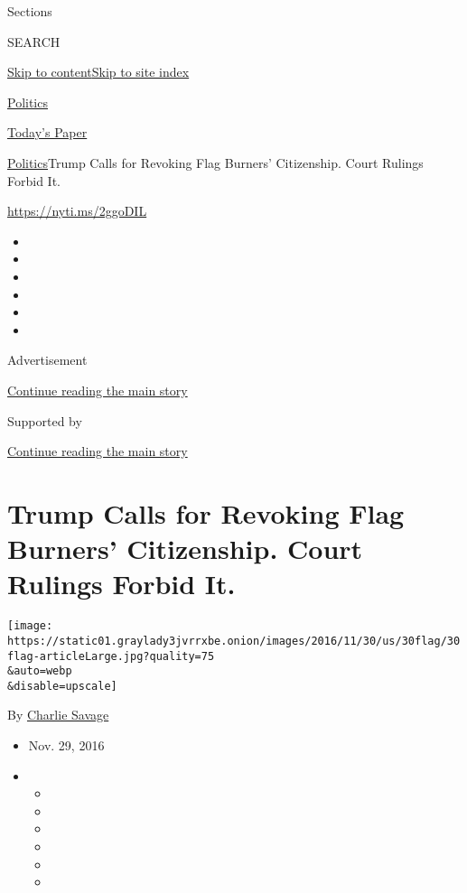 Sections

SEARCH

\protect\hyperlink{site-content}{Skip to
content}\protect\hyperlink{site-index}{Skip to site index}

\href{https://www.nytimes3xbfgragh.onion/section/politics}{Politics}

\href{https://myaccount.nytimes3xbfgragh.onion/auth/login?response_type=cookie\&client_id=vi}{}

\href{https://www.nytimes3xbfgragh.onion/section/todayspaper}{Today's
Paper}

\href{/section/politics}{Politics}\textbar{}Trump Calls for Revoking
Flag Burners' Citizenship. Court Rulings Forbid It.

\url{https://nyti.ms/2ggoDIL}

\begin{itemize}
\item
\item
\item
\item
\item
\item
\end{itemize}

Advertisement

\protect\hyperlink{after-top}{Continue reading the main story}

Supported by

\protect\hyperlink{after-sponsor}{Continue reading the main story}

\hypertarget{trump-calls-for-revoking-flag-burners-citizenship-court-rulings-forbid-it}{%
\section{Trump Calls for Revoking Flag Burners' Citizenship. Court
Rulings Forbid
It.}\label{trump-calls-for-revoking-flag-burners-citizenship-court-rulings-forbid-it}}

\texttt{[image: https://static01.graylady3jvrrxbe.onion/images/2016/11/30/us/30flag/30flag-articleLarge.jpg?quality=75\\\&auto=webp\\\&disable=upscale]}

By \href{http://www.nytimes3xbfgragh.onion/by/charlie-savage}{Charlie
Savage}

\begin{itemize}
\item
  Nov. 29, 2016
\item
  \begin{itemize}
  \item
  \item
  \item
  \item
  \item
  \item
  \end{itemize}
\end{itemize}


